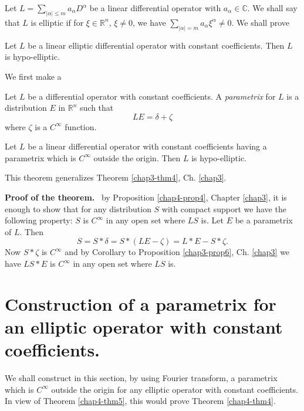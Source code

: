 Let $L=\sum\limits_{|\alpha|\leq m}a_{\alpha}D^{\alpha}$ be a linear differential operator with $a_{\alpha}\in \mathbb{C}$. We shall say that $L$ is elliptic if for $\xi\in \mathbb{R}^{n}$, $\xi\neq 0$, we have $\sum\limits_{|\alpha|=m}a_{\alpha}\xi^{\alpha}\neq 0$. We shall prove

\begin{theorem}\label{chap4-thm4}
Let $L$ be a linear elliptic differential operator with constant coefficients. Then $L$ is hypo-elliptic.
\end{theorem}

We first make a

\begin{defi*}
Let $L$ be a differential operator with constant coefficients. A {\em parametrix} for $L$ is a distribution $E$ in $\mathbb{R}^{n}$ such that
$$
LE=\delta +\zeta
$$
where $\zeta$ is a $C^{\infty}$ function.
\end{defi*}

\begin{theorem}\label{chap4-thm5}
Let $L$ be a linear differential operator with constant coefficients having a parametrix which is $C^{\infty}$ outside the origin. Then $L$ is hypo-elliptic.
\end{theorem}

\begin{remark*}
This theorem generalizes Theorem \ref{chap3-thm4}, Ch. \ref{chap3}.
\end{remark*}

\noindent
{\bf Proof of the theorem.}~
by Proposition \ref{chap4-prop4}, Chapter \ref{chap3}, it is enough to show that for any distribution $S$ with compact support we have the following property: $S$ is $C^{\infty}$ in any open set where $LS$ is. Let $E$ be a parametrix of $L$. Then 
$$
S=S\ast \delta =S\ast (LE-\zeta)=L\ast E-S\ast \zeta.
$$\pageoriginale
Now $S\ast \zeta$ is $C^{\infty}$ and by Corollary to Proposition \ref{chap3-prop6}, Ch. \ref{chap3} we have $LS\ast E$ is $C^{\infty}$ in any open set where $LS$ is.

\section*{Construction of a parametrix for an elliptic operator with constant coefficients.}

We shall construct in this section, by using Fourier transform, a parametrix which is $C^{\infty}$ outside the origin for any elliptic operator with constant coefficients. In view of Theorem \ref{chap4-thm5}, this would prove Theorem \ref{chap4-thm4}.

